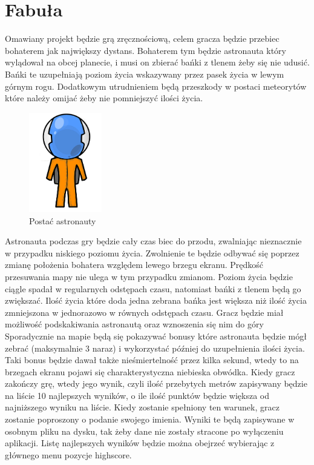 \section{Fabuła}

\hspace{1cm} Omawiany projekt będzie grą zręcznościową, celem gracza będzie przebiec bohaterem jak największy dystans. Bohaterem tym będzie astronauta który wylądował na obcej planecie, i musi on zbierać bańki z tlenem żeby się nie udusić. Bańki te uzupełniają poziom życia wskazywany przez pasek życia w lewym górnym rogu. Dodatkowym utrudnieniem będą przeszkody w postaci meteorytów które należy omijać żeby nie pomniejszyć ilości życia.

 
\begin{figure}
\begin{center}
\includegraphics[width=120px]{./Pictures/astro.jpg}
\end{center}
\caption{Postać astronauty }
\label{Etykieta}
\end{figure}


Astronauta podczas gry będzie cały czas biec do przodu, zwalniając nieznacznie w przypadku niskiego poziomu życia. Zwolnienie te będzie odbywać się poprzez zmianę położenia bohatera względem lewego brzegu ekranu. Prędkość przesuwania mapy nie ulega w tym przypadku zmianom. Poziom życia będzie ciągle spadał w regularnych odstępach czasu, natomiast bańki z tlenem będą go zwiększać. Ilość życia które doda jedna zebrana bańka jest większa niż ilość życia zmniejszona w jednorazowo w równych odstępach czasu. Gracz będzie miał możliwość podskakiwania astronautą oraz wznoszenia się nim do góry Sporadycznie na mapie będą się pokazywać bonusy które astronauta będzie mógł zebrać (maksymalnie 3 naraz) i wykorzystać później do uzupełnienia ilości życia. Taki bonus 
będzie dawał także nieśmiertelność przez kilka sekund, wtedy to na brzegach ekranu pojawi się charakterystyczna niebieska obwódka. Kiedy gracz zakończy grę, wtedy jego wynik, czyli ilość przebytych metrów zapisywany będzie na liście 10 najlepszych wyników, o ile ilość punktów będzie większa od najniższego wyniku na liście. Kiedy zostanie spełniony ten warunek, gracz zostanie poproszony o podanie swojego imienia. Wyniki te będą zapisywane w osobnym pliku na dysku, tak żeby dane nie zostały stracone po wyłączeniu aplikacji. Listę najlepszych wyników będzie można obejrzeć wybierając z głównego menu pozycje highscore. 

